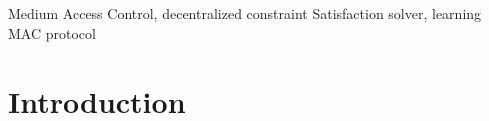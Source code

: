 \documentclass[journal]{IEEEtran}
\begin{document}
\begin{IEEEkeywords}
Medium Access Control, decentralized constraint Satisfaction solver, learning MAC protocol
\end{IEEEkeywords}






%
\IEEEpeerreviewmaketitle



\section{Introduction}
%
%
%
%


\end{document}
